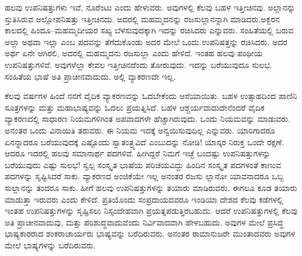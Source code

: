 ಹಲವು ಉಪನಿಷತ್ತುಗಳು ಇವೆ, ನೂರೆಂಟು ಎಂದು ಹೇಳುವರು. ಅವುಗಳಲ್ಲಿ ಕೆಲವು ಬಹಳ ಇತ್ತೀಚಿನವು. ಅಲ್ಲಾನನ್ನು ಸ್ತುತಿಸಿರುವ ಅಲ್ಲೋಪನಿಷತ್ತು ಇತ್ತೀಚಿನದು. ಅದರಲ್ಲಿ ಮಹಮ್ಮದನನ್ನು ರಜಸುಲ್ಲಾನನ್ನಾಗಿ ಮಾಡಿದರು.\break ಅಕ್ಬರನ ಕಾಲದಲ್ಲಿ ಹಿಂದೂ–ಮಹಮ್ಮದೀಯರ ಸಖ್ಯ ಬೆಳಸುವುದಕ್ಕಾಗಿ ಇದನ್ನು ರಚಿಸಿದರು ಎನ್ನುವರು. ಸಂಹಿತೆಯಲ್ಲಿ ಬರುವ ಅಲ್ಲಾ ಅಥವಾ ಇಲ್ಲಾ ಎಂಬ ಪದವನ್ನು ತೆಗೆದುಕೊಂಡು ಅದರ ಮೇಲೆ ಒಂದು ಉಪನಿಷತ್ತನ್ನು ರಚಿಸಿದರು. ಅದರ ಅರ್ಥ ಏನೇ ಆಗಿರಲಿ, ಅದರಲ್ಲಿ ಮಹಮ್ಮದನು ರಜಸುಲ್ಲಾ ಎಂದು ಹೇಳಿದೆ. ಇಂತಹ ಹಲವು ಪಂಥೀಯ ಉಪನಿಷತ್ತುಗಳಿವೆ. ಅವುಗಳೆಲ್ಲಾ ಕೇವಲ ಇತ್ತೀಚಿನದೆಂದು ತೋರುವುದು. ಇದನ್ನು ಬರೆಯುವುದೂ ಸುಲಭ. ಸಂಹಿತೆಯ ಭಾಷೆ ಅತಿ ಪ್ರಾಚೀನವಾದುದು. ಅಲ್ಲಿ ವ್ಯಾಕರಣವೇ ಇಲ್ಲ.

ಕೆಲವು ವರ್ಷಗಳ ಹಿಂದೆ ನನಗೆ ವೈದಿಕ ವ್ಯಾಕರಣವನ್ನು ಓದಬೇಕೆಂದು ಆಸೆಯಾಯಿತು. ಬಹಳ ಉತ್ಸಾಹದಿಂದ ಪಾಣಿನಿ ಸೂತ್ರಗಳನ್ನು ಮತ್ತು ಮಹಾಭಾಷ್ಯವನ್ನು ಓದಲು ಪ್ರಯತ್ನಿಸಿದೆ. ಬಹಳ ಆಶ್ಚರ್ಯವಾದುದೇನೆಂದರೆ ವೈದಿಕ ವ್ಯಾಕರಣದಲ್ಲಿ ಸಾಧಾರಣ ನಿಯಮಗಳಿಗಿಂತ ಅಪವಾದಗಳೇ ಹೆಚ್ಚಾಗಿರು\-ವುದು. ಒಂದು ನಿಯಮವನ್ನು ಮಾಡುವರು. ಅನಂತರ ಒಂದು ವಿನಾಯಿತಿ ತರುವರು. ಈ ನಿಯಮ ಇದಕ್ಕೆ ಅನ್ವಯಿಸುವುದಿಲ್ಲ ಎನ್ನುವರು. ಯಾರಿಗಾದರೂ ಏನನ್ನಾದರೂ ಬರೆಯುವುದಕ್ಕೆ ಎಷ್ಟೊಂದು ಸ್ವಾತಂತ್ರ್ಯವಿದೆ ಎಂಬುದನ್ನು ನೋಡಿ! ಯಾಸ್ಕರ ನಿರುಕ್ತ ಒಂದೇ ರಕ್ಷಣೆ. ಆದರೂ ಇದರಲ್ಲಿ ಹಲವು ಸಮಾನಾರ್ಥ ಪದಗಳಿವೆ. ಹೀಗಿದ್ದರೆ ನಿಮಗೆ ಇಚ್ಛೆ ಬಂದಷ್ಟು ಉಪನಿಷತ್ತುಗಳನ್ನು ಬರೆಯುವುದು ಎಷ್ಟು ಸುಲಭ! ಸ್ವಲ್ಪ ಸಂಸ್ಕೃತ ಭಾಷೆಯ ಪರಿಚಯವಿದ್ದು ಹಿಂದಿನ ಸಂಸ್ಕೃತ ಪದಗಳಂತೆ ಕಾಣುವ ಪದಗಳನ್ನು ಸೃಷ್ಟಿಸಿದರೆ ಸಾಕು. ವ್ಯಾಕರಣದ ಅಂಜಿಕೆಯೇ ಇಲ್ಲ ಅನಂತರ ರಜಸು ಲ್ಲಾನೋ ಯಾವನಾದರೂ ಒಬ್ಬ ಸುಲ್ಲಾನನ್ನು ತಂದರೂ ಸಾಕು. ಹೀಗೆ ಹಲವು ಉಪನಿಷತ್ತುಗಳನ್ನು ತಯಾರು ಮಾಡಿರುವರು. ಈಗಲೂ ಕೂಡ ತಯಾರು ಮಾಡುತ್ತಾ ಇರುವರು ಎಂದು ಕೇಳಿದೆ. ಪ್ರತಿಯೊಂದು ಸಂಪ್ರದಾಯದವರೂ ಇಂಡಿಯಾ ದೇಶದ ಕೆಲವು ಕಡೆಗಳಲ್ಲಿ ಇಂತಹ ಉಪನಿಷತ್ತುಗಳನ್ನು ಸೃಷ್ಟಿಸಲು ನಿಸ್ಸಂದೇಹವಾಗಿ ಪ್ರಯತ್ನಪಡುತ್ತಿರಬಹುದು. ಆದರೆ ಉಪನಿಷತ್ತುಗಳಲ್ಲಿ ಕೆಲವು ಅತಿ ಪ್ರಾಚೀನವಾದುವು, ಮತ್ತು ಪರಿಶುದ್ಧವಾದುವೆಂದು ನಿರ್ವಿವಾದವಾಗಿ ಹೇಳಬಹುದು. ಅವುಗಳ ಮೇಲೆ ಪ್ರಸಿದ್ಧ ಭಾಷ್ಯಕಾರರಾದ ಶಂಕರಾಚಾರ್ಯರು ಭಾಷ್ಯವನ್ನು ಬರೆದಿರುವರು. ಅನಂತರ ರಾಮಾನುಜರೇ ಮುಂತಾದವರು ಅವುಗಳ ಮೇಲೆ ಭಾಷ್ಯಗಳನ್ನು ಬರೆದಿರುವರು.

